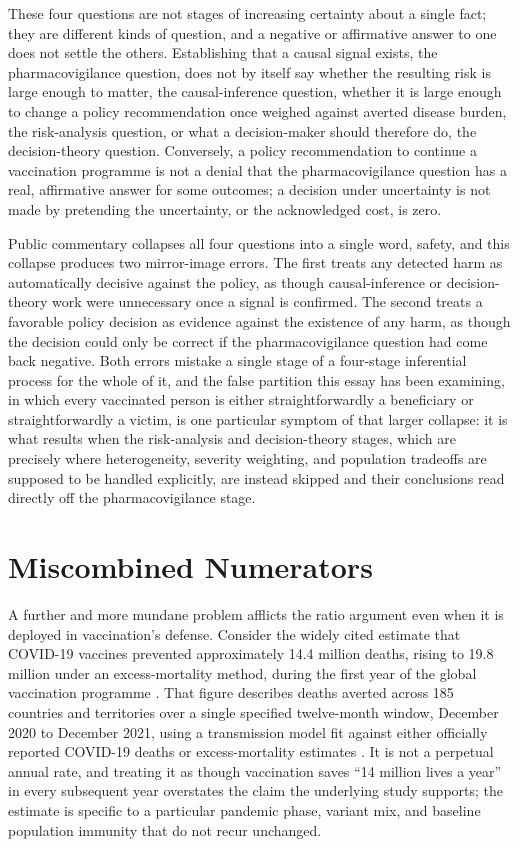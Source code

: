 \documentclass[11pt]{article}
\begin{document}
These four questions are not stages of increasing certainty about a single fact; they are different kinds of question, and a negative or affirmative answer to one does not settle the others. Establishing that a causal signal exists, the pharmacovigilance question, does not by itself say whether the resulting risk is large enough to matter, the causal-inference question, whether it is large enough to change a policy recommendation once weighed against averted disease burden, the risk-analysis question, or what a decision-maker should therefore do, the decision-theory question. Conversely, a policy recommendation to continue a vaccination programme is not a denial that the pharmacovigilance question has a real, affirmative answer for some outcomes; a decision under uncertainty is not made by pretending the uncertainty, or the acknowledged cost, is zero.

Public commentary collapses all four questions into a single word, safety, and this collapse produces two mirror-image errors. The first treats any detected harm as automatically decisive against the policy, as though causal-inference or decision-theory work were unnecessary once a signal is confirmed. The second treats a favorable policy decision as evidence against the existence of any harm, as though the decision could only be correct if the pharmacovigilance question had come back negative. Both errors mistake a single stage of a four-stage inferential process for the whole of it, and the false partition this essay has been examining, in which every vaccinated person is either straightforwardly a beneficiary or straightforwardly a victim, is one particular symptom of that larger collapse: it is what results when the risk-analysis and decision-theory stages, which are precisely where heterogeneity, severity weighting, and population tradeoffs are supposed to be handled explicitly, are instead skipped and their conclusions read directly off the pharmacovigilance stage.

\section{Miscombined Numerators}

A further and more mundane problem afflicts the ratio argument even when it is deployed in vaccination's defense. Consider the widely cited estimate that COVID-19 vaccines prevented approximately 14.4 million deaths, rising to 19.8 million under an excess-mortality method, during the first year of the global vaccination programme \citep{watson2022}. That figure describes deaths averted across 185 countries and territories over a single specified twelve-month window, December 2020 to December 2021, using a transmission model fit against either officially reported COVID-19 deaths or excess-mortality estimates \citep{watson2022}. It is not a perpetual annual rate, and treating it as though vaccination saves ``14 million lives a year'' in every subsequent year overstates the claim the underlying study supports; the estimate is specific to a particular pandemic phase, variant mix, and baseline population immunity that do not recur unchanged.
\end{document}
